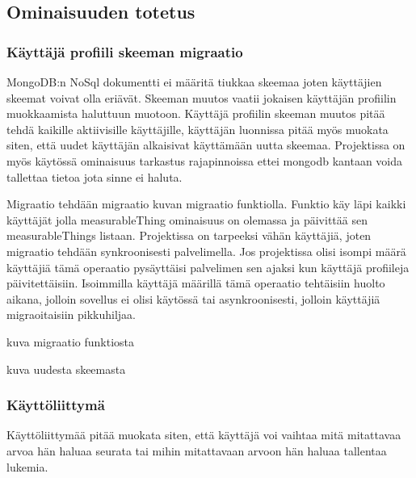 \subsection{Ominaisuuden totetus}


\subsubsection{Käyttäjä profiili skeeman migraatio}

MongoDB:n NoSql dokumentti ei määritä tiukkaa skeemaa joten käyttäjien skeemat voivat olla eriävät.
Skeeman muutos vaatii jokaisen käyttäjän profiilin muokkaamista haluttuun muotoon.
Käyttäjä profiilin skeeman muutos pitää tehdä kaikille aktiivisille käyttäjille, käyttäjän luonnissa pitää myös muokata siten, 
että uudet käyttäjän alkaisivat käyttämään uutta skeemaa.
Projektissa on myös käytössä ominaisuus tarkastus rajapinnoissa ettei mongodb kantaan voida tallettaa tietoa jota sinne ei haluta.
\medskip

Migraatio tehdään migraatio kuvan \nextImageCount {} migraatio funktiolla. 
Funktio käy läpi kaikki käyttäjät jolla measurableThing ominaisuus on olemassa ja päivittää sen measurableThings listaan.
Projektissa on tarpeeksi vähän käyttäjiä, joten migraatio tehdään synkroonisesti palvelimella. 
Jos projektissa olisi isompi määrä käyttäjiä tämä operaatio pysäyttäisi palvelimen sen ajaksi kun käyttäjä profiileja päivitettäisiin.
Isoimmilla käyttäjä määrillä tämä operaatio tehtäisiin huolto aikana, jolloin sovellus ei olisi käytössä tai asynkroonisesti, 
jolloin käyttäjiä migraoitaisiin pikkuhiljaa.


\bigskip

kuva migraatio funktiosta
\medskip

\bigskip


kuva uudesta skeemasta
\medskip









\subsubsection{Käyttöliittymä}

Käyttöliittymää pitää muokata siten,
että käyttäjä voi vaihtaa mitä mitattavaa arvoa hän haluaa seurata tai mihin mitattavaan arvoon hän haluaa tallentaa lukemia.

